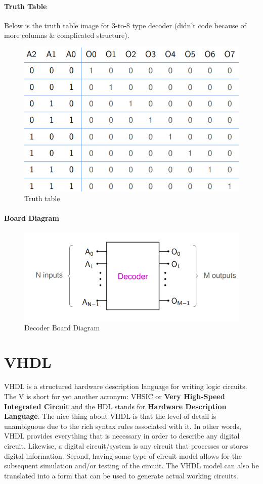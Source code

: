 \documentclass{report}
\begin{document}
\subsubsection{Truth Table}
Below is the truth table image for 3-to-8 type decoder (didn't code because of more columns \& complicated structure).
\begin{figure}[h]
    \centering
    \includegraphics[scale=0.5]{dec_tt.png}
    \caption{Truth table}
    \label{fig:my_label}
\end{figure} 
\subsubsection{Board Diagram}
\begin{figure}[h]
    \centering
    \includegraphics[scale=0.5]{enc_borad.png}
    \caption{Decoder Board Diagram}
    \label{fig:my_label}
\end{figure} 


\chapter{VHDL}
VHDL is a structured hardware description language for writing logic circuits. The V is short for yet another acronym: VHSIC or \textbf{Very High-Speed Integrated Circuit} and the HDL stands for \textbf{Hardware Description Language}. The nice thing about VHDL is that the level of detail is unambiguous due to the rich syntax rules associated with it. In other words, VHDL provides everything that is necessary in order to describe any digital circuit. Likewise, a digital circuit/system is any circuit that processes or stores digital information. Second, having some type of circuit model allows for the subsequent simulation and/or testing of the circuit. The VHDL model can also be translated into a form that can be used to generate actual working circuits. 
\end{document}
